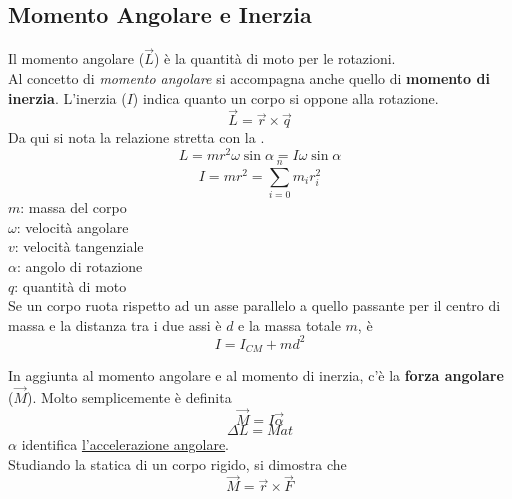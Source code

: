 \subsection{Momento Angolare e Inerzia}\label{subsec:dinamica:inerzia}
Il momento angolare ($\vec{L}$) è la quantità di moto per le rotazioni.\\
Al concetto di \emph{momento angolare} si accompagna anche quello di \textbf{momento di inerzia}. 
L'inerzia ($I$) indica quanto un corpo si oppone alla rotazione.\\
\begin{equation*}
  \vec{L} = \vec{r} \times \vec{q}
\end{equation*}
Da qui si nota la relazione stretta con la .
\begin{equation*}
  L = mr^2\omega\sin\alpha = I\omega\sin\alpha
\end{equation*}
\begin{equation*}
  I = mr^2 = \sum\limits_{i=0}^{n}m_ir_i^2
\end{equation*}
$m$: massa del corpo\\
$\omega$: velocità angolare\\
$v$: velocità tangenziale\\
$\alpha$: angolo di rotazione\\
$q$: quantità di moto\\[\baselineskip]
Se un corpo ruota rispetto ad un asse parallelo a quello passante per il centro di massa e la distanza
tra i due assi è $d$ e la massa totale $m$, è
\begin{equation*}
  I = I_{CM}+md^2
\end{equation*}
\begin{center}
\end{center}
In aggiunta al momento angolare e al momento di inerzia, c'è la \textbf{forza angolare} ($\vec{M}$).
Molto semplicemente è definita
\begin{equation*}
  \vec{M} = I\vec{\alpha}
\end{equation*}
\begin{equation*}
  \Delta L = Mat
\end{equation*}
$\alpha$ identifica \hyperref[subsec:mrua]{l'accelerazione angolare}.\\
Studiando la statica di un corpo rigido, si dimostra che
\begin{equation*}
  \vec{M} = \vec{r} \times \vec{F}
\end{equation*}

